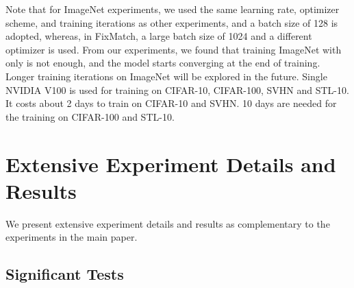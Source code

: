 \documentclass{article} \usepackage{iclr2023_conference,times}
\theoremstyle{plain}
\theoremstyle{definition}
\theoremstyle{remark}
\newcommand{\revision}[1]{{\color{black}{#1}}}
\begin{document}
Note that for ImageNet experiments, we used the same learning rate, optimizer scheme, and training iterations as other experiments, and a batch size of 128 is adopted, whereas, in FixMatch, a large batch size of 1024 and a different optimizer is used. From our experiments, we found that training ImageNet with only  is not enough, and the model starts converging at the end of training. Longer training iterations on ImageNet will be explored in the future. Single NVIDIA V100 is used for training on CIFAR-10, CIFAR-100, SVHN and STL-10. It costs about 2 days to train on CIFAR-10 and SVHN. 10 days are needed for the training on CIFAR-100 and STL-10.


\section{Extensive Experiment Details and Results}

We present extensive experiment details and results as complementary to the experiments in the main paper.

\subsection{Significant Tests}
\label{append-sig}
\revision{
We did significance test using the Friedman test. We choose the top 7 algorithms on 4 datasets (i.e., ). Then, we compute the F value as , which is clearly larger than the thresholds  and . This test indicates that there are significant differences between all algorithms. 
}
\end{document}
